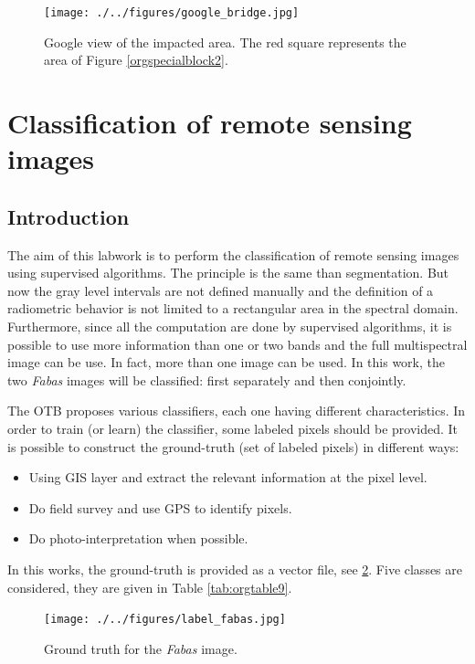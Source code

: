 \documentclass[a4paper,11pt,DIV=18]{scrartcl}
\begin{document}
\begin{figure}[htb]
\centering
\texttt{[image: ./../figures/google\_bridge.jpg]}
\caption{\label{fig:orgparagraph5}
Google view of the impacted area. The red square represents the area of Figure \ref{orgspecialblock2}.}
\end{figure}

\section{Classification of remote sensing images}
\label{sec:orgheadline32}
\subsection{Introduction}
\label{sec:orgheadline27}
The aim  of this labwork  is to  perform the classification  of remote
sensing images using supervised algorithms.  The principle is the same
than segmentation.  But  now the gray level intervals  are not defined
manually and the  definition of a radiometric behavior  is not limited
to a rectangular area in  the spectral domain.  Furthermore, since all
the computation are  done by supervised algorithms, it  is possible to
use more information than one or  two bands and the full multispectral
image can be use.  In fact, more  than one image can be used.  In this
work, the  two \emph{Fabas} images  will be classified: first  separately and
then conjointly.

The  OTB  proposes  various  classifiers, each  one  having  different
characteristics.  In  order to train  (or learn) the  classifier, some
labeled pixels  should be  provided. It is  possible to  construct the
ground-truth (set of labeled pixels) in different ways:
\begin{itemize}
\item Using GIS layer and extract the relevant information at the pixel
level.
\item Do field survey and use GPS to identify pixels.
\item Do photo-interpretation when possible.
\end{itemize}
In this  works, the  ground-truth is  provided as  a vector  file, see
\ref{fig:orgparagraph6}.   Five  classes  are  considered,  they  are  given  in  Table
\ref{tab:orgtable9}.

\begin{figure}[htb]
\centering
\texttt{[image: ./../figures/label\_fabas.jpg]}
\caption{\label{fig:orgparagraph6}
Ground truth for the \emph{Fabas} image.}
\end{figure}
\end{document}
